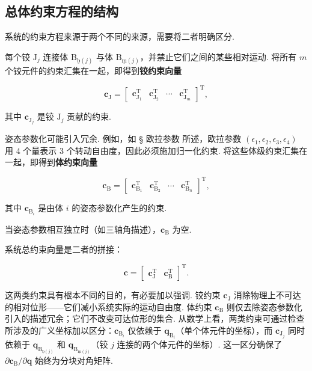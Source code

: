 \subsection{总体约束方程的结构}
系统的约束方程来源于两个不同的来源，需要将二者明确区分.
\begin{definition}[定义 9.2（铰约束向量）]
每个铰 $\text{J}_j$ 连接体 $\text{B}_{\underline{\text{b}}(j)}$ 与体 $\text{B}_{\underline{\text{m}}(j)}$，并禁止它们之间的某些相对运动. 将所有 $m$ 个铰元件的约束汇集在一起，即得到\textbf{铰约束向量}

\[
\boldsymbol{c}_{\text{J}} = \begin{bmatrix} \boldsymbol{c}_{\text{J}_1}^\text{T} & \boldsymbol{c}_{\text{J}_2}^\text{T} & \cdots & \boldsymbol{c}_{\text{J}_m}^\text{T} \end{bmatrix}^\text{T},
\]

其中 $\boldsymbol{c}_{\text{J}_j}$ 是铰 $\text{J}_j$ 贡献的约束.
\end{definition}
\begin{definition}[定义 9.3（体约束向量）]
姿态参数化可能引入冗余. 例如，如 § 欧拉参数 所述，欧拉参数 $(\epsilon_1, \epsilon_2, \epsilon_3, \epsilon_4)$ 用 4 个量表示 3 个转动自由度，因此必须施加归一化约束. 将这些体级约束汇集在一起，即得到\textbf{体约束向量}

\[
\boldsymbol{c}_{\text{B}} = \begin{bmatrix} \boldsymbol{c}_{\text{B}_1}^\text{T} & \boldsymbol{c}_{\text{B}_2}^\text{T} & \cdots & \boldsymbol{c}_{\text{B}_n}^\text{T} \end{bmatrix}^\text{T},
\]

其中 $\boldsymbol{c}_{\text{B}_i}$ 是由体 $i$ 的姿态参数化产生的约束.

当姿态参数相互独立时（如三轴角描述），$\boldsymbol{c}_{\text{B}}$ 为空.
\end{definition}
\begin{definition}[定义 9.4（系统总约束向量）]
系统总约束向量是二者的拼接：

\[
\boldsymbol{c} = \begin{bmatrix} \boldsymbol{c}_{\text{J}}^\text{T} & \boldsymbol{c}_{\text{B}}^\text{T} \end{bmatrix}^\text{T}.
\]
\end{definition}
这两类约束具有根本不同的目的，有必要加以强调.
铰约束 $\boldsymbol{c}_{\text{J}}$ 消除物理上不可达的相对位形——它们减小系统实际的运动自由度.
体约束 $\boldsymbol{c}_{\text{B}}$ 则仅去除姿态参数化引入的描述冗余；它们不改变可达位形的集合.
从数学上看，两类约束可通过检查所涉及的广义坐标加以区分：$\boldsymbol{c}_{\text{B}_i}$ 仅依赖于 $\boldsymbol{q}_{\text{B}_i}$（单个体元件的坐标），而 $\boldsymbol{c}_{\text{J}_j}$ 同时依赖于 $\boldsymbol{q}_{\text{B}_{\underline{\text{b}}(j)}}$ 和 $\boldsymbol{q}_{\text{B}_{\underline{\text{m}}(j)}}$（铰 $j$ 连接的两个体元件的坐标）. 这一区分确保了 $\partial \boldsymbol{c}_{\text{B}} / \partial \boldsymbol{q}$ 始终为分块对角矩阵.

